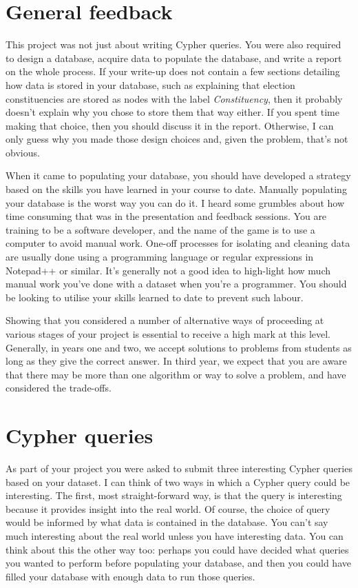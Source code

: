 \section*{General feedback}
This project was not just about writing Cypher queries.
You were also required to design a database, acquire data to populate the database, and write a report on the whole process.
If your write-up does not contain a few sections detailing how data is stored in your database, such as explaining that election constituencies are stored as nodes with the label \emph{Constituency}, then it probably doesn't explain why you chose to store them that way either.
If you spent time making that choice, then you should discuss it in the report.
Otherwise, I can only guess why you made those design choices and, given the problem, that's not obvious.

When it came to populating your database, you should have developed a strategy based on the skills you have learned in your course to date.
Manually populating your database is the worst way you can do it.
I heard some grumbles about how time consuming that was in the presentation and feedback sessions.
You are training to be a software developer, and the name of the game is to use a computer to avoid manual work.
One-off processes for isolating and cleaning data are usually done using a programming language or regular expressions in Notepad++ or similar.
It's generally not a good idea to high-light how much manual work you've done with a dataset when you're a programmer.
You should be looking to utilise your skills learned to date to prevent such labour.

Showing that you considered a number of alternative ways of proceeding at various stages of your project is essential to receive a high mark at this level.
Generally, in years one and two, we accept solutions to problems from students as long as they give the correct answer.
In third year, we expect that you are aware that there may be more than one algorithm or way to solve a problem, and have considered the trade-offs.

\section*{Cypher queries}
As part of your project you were asked to submit three interesting Cypher queries based on your dataset.
I can think of two ways in which a Cypher query could be interesting.
The first, most straight-forward way, is that the query is interesting because it provides insight into the real world.
Of course, the choice of query would be informed by what data is contained in the database.
You can't say much interesting about the real world unless you have interesting data.
You can think about this the other way too: perhaps you could have decided what queries you wanted to perform before populating your database, and then you could have filled your database with enough data to run those queries.

